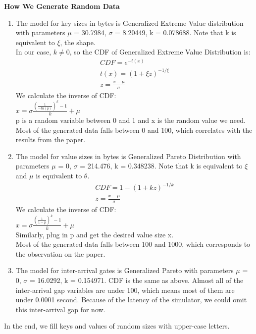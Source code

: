 \documentclass[11pt]{article}
\begin{document}
{\bf How We Generate Random Data}
\begin{enumerate}
	\item
		The model for key sizes in bytes is Generalized Extreme Value distribution with parameters $\mu$ = 30.7984, $\sigma$ = 8.20449, k = 0.078688. Note that k is equivalent to $\xi$, the shape. \\
		
		In our case, $k\neq 0$, so the CDF of Generalized Extreme Value Distribution is:
		\begin{gather}
			CDF = e^{-t(x)}\\ t(x) = {(1+\xi z)}^{-1/\xi} \\ z = \frac{x - \mu}{\sigma}
		\end{gather}
		We calculate the inverse of CDF: \\
		$ x = \sigma \frac{{(\frac{1}{-ln(p)})}^k-1}{k} + \mu $\\
		p is a random variable between 0 and 1 and x is the random value we need. \\
		Most of the generated data falls between 0 and 100, which correlates with the results from the paper. 
		 
	\item
		The model for value sizes in bytes is Generalized Pareto Distribution with parameters  $\mu$ = 0, $\sigma$ = 214.476, k = 0.348238. Note that k is equivalent to $\xi$ and $\mu$ is equivalent to $\theta$. \\
		\begin{gather}
			CDF = 1 - {(1 + kz)}^{-1/k}\\
			z = \frac{x - \mu}{\sigma}
		\end{gather}
		We calculate the inverse of CDF: \\
		$ x = \sigma \frac{{(\frac{1}{1-p})}^k - 1}{k} + \mu$ \\
		Similarly, plug in p and get the desired value size x. \\
		Most of the generated data falls between 100 and 1000, which corresponds to the observation on the paper.  
		

	\item
		The model for inter-arrival gates is Generalized Pareto with parameters $\mu$ = 0, $\sigma$ = 16.0292, k = 0.154971. CDF is the same as above. 
		Almost all of the inter-arrival gap variables are under 100, which means most of them are under 0.0001 second. Because of the latency of the simulator, we could omit this inter-arrival gap for now. 		
		
		
\end{enumerate}
In the end, we fill keys and values of random sizes with upper-case letters. \\ \\
\end{document}
